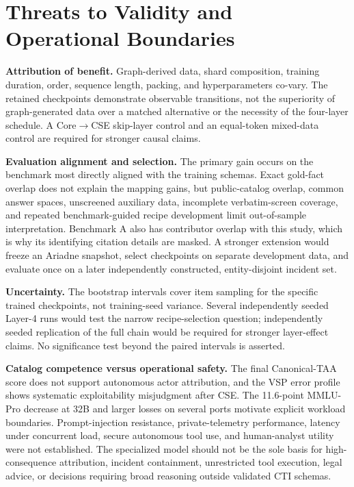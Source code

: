 \documentclass[conference]{IEEEtran}
\begin{document}
\section{Threats to Validity and Operational Boundaries}
\textbf{Attribution of benefit.} Graph-derived data, shard composition, training duration, order, sequence length, packing, and hyperparameters co-vary. The retained checkpoints demonstrate observable transitions, not the superiority of graph-generated data over a matched alternative or the necessity of the four-layer schedule. A Core$\rightarrow$CSE skip-layer control and an equal-token mixed-data control are required for stronger causal claims.

\textbf{Evaluation alignment and selection.} The primary gain occurs on the benchmark most directly aligned with the training schemas. Exact gold-fact overlap does not explain the mapping gains, but public-catalog overlap, common answer spaces, unscreened auxiliary data, incomplete verbatim-screen coverage, and repeated benchmark-guided recipe development limit out-of-sample interpretation. Benchmark A also has contributor overlap with this study, which is why its identifying citation details are masked. A stronger extension would freeze an Ariadne snapshot, select checkpoints on separate development data, and evaluate once on a later independently constructed, entity-disjoint incident set.

\textbf{Uncertainty.} The bootstrap intervals cover item sampling for the specific trained checkpoints, not training-seed variance. Several independently seeded Layer-4 runs would test the narrow recipe-selection question; independently seeded replication of the full chain would be required for stronger layer-effect claims. No significance test beyond the paired intervals is asserted.

\textbf{Catalog competence versus operational safety.} The final Canonical-TAA score does not support autonomous actor attribution, and the VSP error profile shows systematic exploitability misjudgment after CSE. The 11.6-point MMLU-Pro decrease at 32B and larger losses on several ports motivate explicit workload boundaries. Prompt-injection resistance, private-telemetry performance, latency under concurrent load, secure autonomous tool use, and human-analyst utility were not established. The specialized model should not be the sole basis for high-consequence attribution, incident containment, unrestricted tool execution, legal advice, or decisions requiring broad reasoning outside validated CTI schemas.
\end{document}
